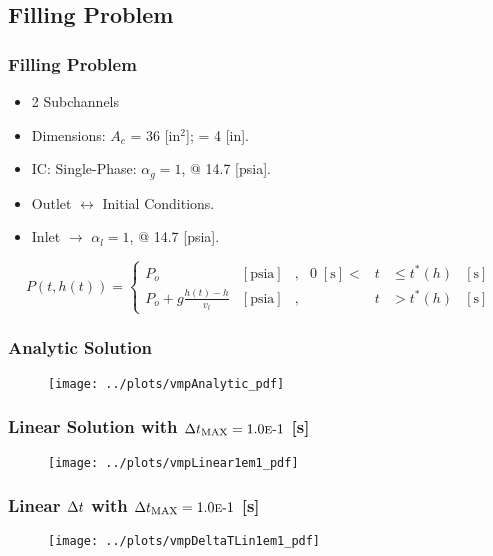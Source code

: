\documentclass[compress,xcolor=table]{beamer}
\begin{document}
\subsection[Filling Problem]{Filling Problem}
\begin{frame}
\frametitle{Filling Problem}

\begin{itemize}
\item{2 Subchannels}
\item{Dimensions: $A_{c}$ = 36 [in$^2$]; \dx{} = 4 [in].}
\item{IC: Single-Phase: $\alpha_{g} = 1$, @ 14.7 [psia].}
\item{Outlet $\longleftrightarrow$ Initial Conditions.}
\item{Inlet $\rightarrow$ $\alpha_{l}=1$, @ 14.7 [psia].}
\end{itemize}
\begin{equation*}
P(t, h(t))= 
 \left\{
\begin{array}{cclrcll}
P_o & [ \text{psia} ] & , & 0\; [\text{s}] < & t & \leq t^{*}(h) & [\text{s}] \\
P_o + g \frac{ h(t) - h }{ v_{l} } & [ \text{psia} ] & , &  & t & > t^{*}(h) & [\text{s}]
\end{array}\right.
\end{equation*}

\end{frame}
\begin{frame}
\frametitle{Analytic Solution}

\begin{figure}[h!t]
\centering
\texttt{[image: ../plots/vmpAnalytic\_pdf]}
\end{figure}

\end{frame}
\begin{frame}
\frametitle{Linear Solution with $\dtmax{} = \expneg{1.0}{1}$ [s]}

\begin{figure}[h!t]
\centering
\texttt{[image: ../plots/vmpLinear1em1\_pdf]}
\end{figure}

\end{frame}
\begin{frame}
\frametitle{Linear $\dt{}$ with $\dtmax{} = \expneg{1.0}{1}$ [s]}

\begin{figure}[h!t]
\centering
\texttt{[image: ../plots/vmpDeltaTLin1em1\_pdf]}
\end{figure}

\end{frame}
\end{document}
